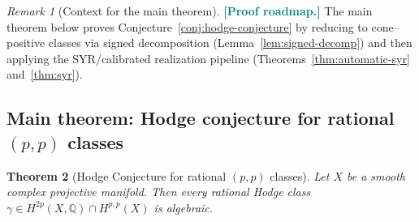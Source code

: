 \documentclass[11pt]{article}
\newcommand{\REVMZ}[1]{\textcolor{teal}{#1}}  %
\numberwithin{equation}{section}  %
\theoremstyle{plain}
\newtheorem{theorem}{Theorem}[section]
\theoremstyle{definition}
\theoremstyle{remark}
\newtheorem{remark}[theorem]{Remark}
\newcommand{\Q}{\mathbb{Q}}
\begin{document}
\begin{remark}[Context for the main theorem]\label{rem:hodge-context}
\REVMZ{\textbf{[Proof roadmap.]}}
The main theorem below proves Conjecture~\ref{conj:hodge-conjecture} by reducing to cone--positive classes via signed decomposition (Lemma~\ref{lem:signed-decomp}) and then applying the SYR/calibrated realization pipeline (Theorems~\ref{thm:automatic-syr} and~\ref{thm:syr}).
\end{remark}
\subsection*{Main theorem: Hodge conjecture for rational $(p,p)$ classes}

\begin{theorem}[Hodge Conjecture for rational $(p,p)$ classes]
\label{thm:main-hodge}
Let $X$ be a smooth complex projective manifold.  Then every rational Hodge
class $\gamma \in H^{2p}(X,\Q) \cap H^{p,p}(X)$ is algebraic.
\end{theorem}
\end{document}
